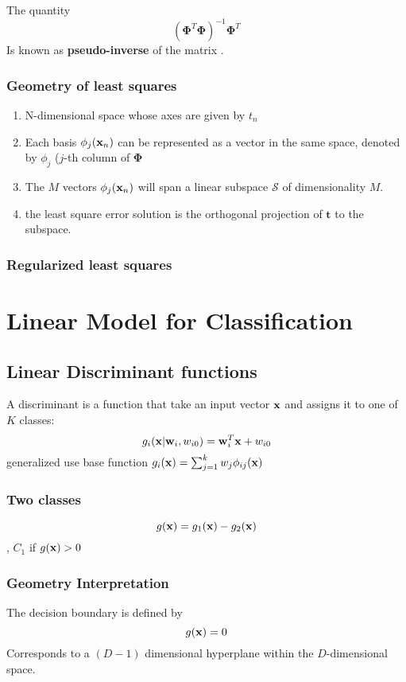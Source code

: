 The quantity
\begin{equation}
    (\boldsymbol\Phi^T\boldsymbol\Phi)^{-1}\boldsymbol\Phi^T
\end{equation}
Is known as \textbf{pseudo-inverse} of the matrix .
\subsection{Geometry of least squares}
\begin{enumerate}
    \item N-dimensional space whose axes are given by $t_n$
    \item Each basis $\phi_j(\mathbf{x}_n)$ can be represented as a vector in the
    same space, denoted by $\phi_j$ ($j$-th column of $\boldsymbol\Phi$
    \item The $M$ vectors $\phi_j(\mathbf{x}_n)$ will span a linear subspace
        $\mathcal{S}$ of dimensionality $M$.
    \item the least square error solution is the orthogonal projection of
        $\mathbf{t}$ to the subspace.
\end{enumerate}

\subsection{Regularized least squares}

\chapter{Linear Model for Classification}
\section{Linear Discriminant functions}
A discriminant is a function that take an input vector $\mathbf{x}$ and assigns
it to one of $K$ classes:
\[g_i(\mathbf{x}|\mathbf{w}_i, w_{i0}) =\mathbf{w}_i^T\mathbf{x} + w_{i0}\] generalized use base
function $g_i(\mathbf{x}) = \sum_{j=1}^k w_j \phi_{ij}(\mathbf{x})$
\subsection{Two classes}
\[g(\mathbf{x}) = g_1(\mathbf{x}) - g_2(\mathbf{x}) \], $C_1$ if $g(\mathbf{x})>0$

\subsection{Geometry Interpretation}
The decision boundary is defined by 
\[ g(\mathbf{x}) = 0\]
Corresponds to a $(D-1)$ dimensional hyperplane within the $D$-dimensional
space.

